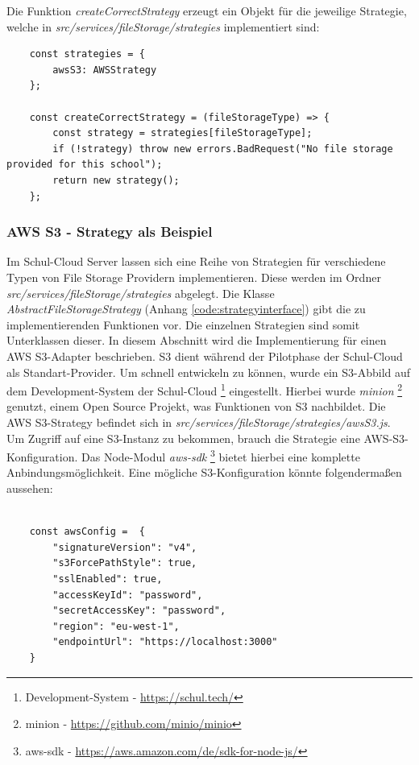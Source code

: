 Die Funktion \textit{createCorrectStrategy} erzeugt ein Objekt für die jeweilige Strategie, welche in \textit{src/services/fileStorage/strategies} implementiert sind:

\begin{lstlisting}
	const strategies = {
		awsS3: AWSStrategy
	};

	const createCorrectStrategy = (fileStorageType) => {
		const strategy = strategies[fileStorageType];
		if (!strategy) throw new errors.BadRequest("No file storage provided for this school");
		return new strategy();
	};
\end{lstlisting}

\subsubsection{AWS S3 - Strategy als Beispiel}

Im Schul-Cloud Server lassen sich eine Reihe von Strategien für verschiedene Typen von File Storage Providern implementieren. Diese werden im Ordner \textit{src/services/fileStorage/strategies} abgelegt. Die Klasse \textit{AbstractFileStorageStrategy} (Anhang \ref{code:strategyinterface}) gibt die zu implementierenden Funktionen vor. Die einzelnen Strategien sind somit Unterklassen dieser. In diesem Abschnitt wird die Implementierung für einen AWS S3-Adapter beschrieben. S3 dient während der Pilotphase der Schul-Cloud als Standart-Provider. Um schnell entwickeln zu können, wurde ein S3-Abbild auf dem Development-System der Schul-Cloud \footnote{Development-System - \url{https://schul.tech/}} eingestellt. Hierbei wurde \textit{minion} \footnote{minion - \url{https://github.com/minio/minio}} genutzt, einem Open Source Projekt, was Funktionen von S3 nachbildet. Die AWS S3-Strategy befindet sich in \textit{src/services/fileStorage/strategies/awsS3.js}. \\

Um Zugriff auf eine S3-Instanz zu bekommen, brauch die Strategie eine AWS-S3-Konfiguration. Das Node-Modul \textit{aws-sdk} \footnote{aws-sdk - \url{https://aws.amazon.com/de/sdk-for-node-js/}} bietet hierbei eine komplette Anbindungsmöglichkeit. Eine mögliche S3-Konfiguration könnte folgendermaßen aussehen:

\begin{lstlisting}
	
	const awsConfig =  {
		"signatureVersion": "v4",
		"s3ForcePathStyle": true,
		"sslEnabled": true,
		"accessKeyId": "password",
		"secretAccessKey": "password",
		"region": "eu-west-1",
		"endpointUrl": "https://localhost:3000"
	}
\end{lstlisting}

